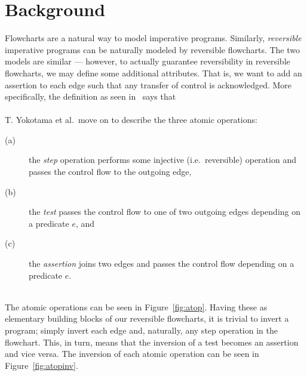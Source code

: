 \chapter*{Background}
%

Flowcharts are a natural way to model imperative programs. Similarly, \textit{reversible} imperative programs can be naturally modeled by reversible flowcharts. The two models are similar --- however, to actually guarantee reversibility in reversible flowcharts, we may define some additional attributes. That is, we want to add an assertion to each edge such that any transfer of control is acknowledged. More specifically, the definition as seen in~\cite{REV} says that \\

 \\

\noindent T. Yokotama et al.\ move on to describe the three atomic operations:\\
\begin{description}
  \item[(a)] the \textit{step} operation performs some injective (i.e.\ reversible) operation and passes the control flow to the outgoing edge,
  \item[(b)] the \textit{test} passes the control flow to one of two outgoing edges depending on a predicate $e$, and
  \item[(c)] the \textit{assertion} joins two edges and passes the control flow depending on a predicate $e$.
\end{description}~\\
\noindent The atomic operations can be seen in Figure~\ref{fig:atop}. Having these as elementary building blocks of our reversible flowcharts, it is trivial to invert a program; simply invert each edge and, naturally, any step operation in the flowchart. This, in turn, means that the inversion of a test becomes an assertion and vice versa. The inversion of each atomic operation can be seen in Figure~\ref{fig:atopinv}.

